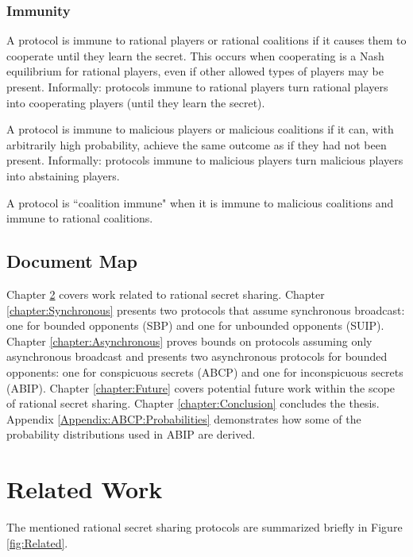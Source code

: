\documentclass[12pt]{dalcsthesis}
\begin{document}
\subsection {Immunity}
\label{Def:Immunity}

A protocol is immune to rational players or rational coalitions if it causes them to cooperate until they learn the secret. This occurs when cooperating is a Nash equilibrium for rational players, even if other allowed types of players may be present. Informally: protocols immune to rational players turn rational players into cooperating players (until they learn the secret).

A protocol is immune to malicious players or malicious coalitions if it can, with arbitrarily high probability, achieve the same outcome as if they had not been present. Informally: protocols immune to malicious players turn malicious players into abstaining players.

A protocol is ``coalition immune" when it is immune to malicious coalitions and immune to rational coalitions.

\section{Document Map}

Chapter \ref{chapter:RelatedWork} covers work related to rational secret sharing. Chapter \ref{chapter:Synchronous} presents two protocols that assume synchronous broadcast: one for bounded opponents (SBP) and one for unbounded opponents (SUIP). Chapter \ref{chapter:Asynchronous} proves bounds on protocols assuming only asynchronous broadcast and presents two asynchronous protocols for bounded opponents: one for conspicuous secrets (ABCP) and one for inconspicuous secrets (ABIP). Chapter \ref{chapter:Future} covers potential future work within the scope of rational secret sharing. Chapter \ref{chapter:Conclusion} concludes the thesis. Appendix \ref{Appendix:ABCP:Probabilities} demonstrates how some of the probability distributions used in ABIP are derived.

\chapter{Related Work}
\label{chapter:RelatedWork}

The mentioned rational secret sharing protocols are summarized briefly in Figure \ref{fig:Related}.
\end{document}
